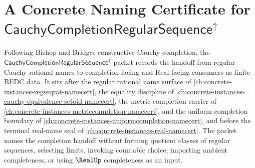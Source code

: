 \providecommand{\CauchyCompletionRegularSequenceUp}{\mathsf{CauchyCompletionRegularSequence}^{\uparrow}}

\chapter{A Concrete Naming Certificate for $\CauchyCompletionRegularSequenceUp$}
\label{ch:concrete-instances-cauchy-completion-regular-sequence-namecert}

Following Bishop and Bridges constructive Cauchy completion, the $\CauchyCompletionRegularSequenceUp$ packet records the handoff from regular Cauchy rational names to completion-facing and Real-facing consumers as finite BEDC data. It sits after the regular rational name surface of \autoref{ch:concrete-instances-regseqrat-namecert}, the equality discipline of \autoref{ch:concrete-instances-cauchy-equivalence-setoid-namecert}, the metric completion carrier of \autoref{ch:concrete-instances-metriccompletion-namecert}, and the uniform completion boundary of \autoref{ch:concrete-instances-uniformcompletion-namecert}, and before the terminal real-name seal of \autoref{ch:concrete-instances-real-namecert}. The packet names the completion handoff without forming quotient classes of regular sequences, selecting limits, invoking countable choice, importing ambient completeness, or using $\RealUp$ completeness as an input.

